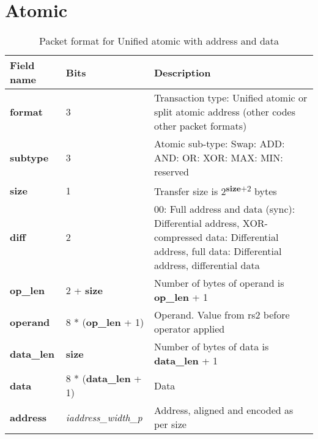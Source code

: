 \FloatBarrier
\section{Atomic} \label{sec:data-atomic}

\begin{table}[htp]
  \centering
  \caption{Packet format for Unified atomic with address and data}
  \label{tab:te_datadx0y5}
  \begin{tabulary}{\textwidth}{|l|p{40mm}|p{90mm}|}
    \hline
    {\bf Field name} & {\bf Bits} & {\bf Description} \\
    \hline
    \textbf{format} & 	3	& Transaction type: Unified atomic or split atomic address\newline	
		(other codes other packet formats)\\
    \hline
    \textbf{subtype} & 	3	& Atomic sub-type: Swap: ADD: AND: OR: XOR: MAX: MIN: reserved\\	
    \hline
    \textbf{size} & 1 & Transfer size is 2\textsuperscript{\textbf{size}+2} bytes\\
    \hline
    \textbf{diff} & 2 & 00: Full address and data (sync): Differential address, XOR-compressed data: Differential address, full data: Differential address, differential data\\
    \hline
    \textbf{op\_len} & 2 + \textbf{size} &	Number of bytes of operand is \textbf{op\_len} + 1\\
    \hline
    \textbf{operand}	& 8 * (\textbf{op\_len} + 1) & Operand.  Value from rs2 before operator applied\\
    \hline
    \textbf{data\_len}	& \textbf{size} & Number of bytes of data is \textbf{data\_len} + 1\\
    \hline
    \textbf{data} & 8 * (\textbf{data\_len} + 1) & 
                Data\\
    \hline
    \textbf{address} &  \textit{iaddress\_width\_p} & Address, aligned and encoded as per size \\
    \hline
  \end{tabulary}
\end{table}


